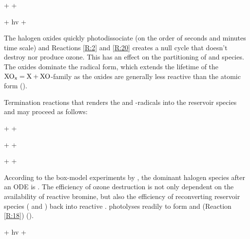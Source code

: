 \begin{reaction}
     +  \rightarrow {} + 
    \label{R:15}
\end{reaction}

\begin{reaction}
     + hv \rightarrow {} + 
    \label{R:20}
\end{reaction}

The halogen oxides quickly photodissociate (on the order of seconds and minutes time scale) and Reactions \ref{R:2} and \ref{R:20} creates a null cycle that doesn't destroy nor produce ozone. This has an effect on the partitioning of  and  species. The oxides dominate the radical form, which extends the lifetime of the $\mathrm{XO_x} = \mathrm{X} + \mathrm{XO}$-family as the oxides are generally less reactive than the atomic form (\cite{Simpson2015}). 


\medskip

Termination reactions that renders the  and -radicals into the reservoir species  and  may proceed as follows: 


\begin{reaction}
     +  \rightarrow {} + 
    \label{R:6} 
\end{reaction}

\begin{reaction}
     +  \rightarrow {} + 
    \label{R:17}
\end{reaction}


\begin{reaction}
     +  \rightarrow {} + 
    \label{R:16}
\end{reaction}


According to the box-model experiments by \cite{CAO}, the dominant halogen species after an ODE is . The efficiency of ozone destruction is not only dependent on the availability of reactive bromine, but also the efficiency of reconverting reservoir species ( and ) back into reactive .  photolyses readily to form  and  (Reaction \ref{R:18}) (\cite{Hausmann1994}).

\begin{reaction}
     + hv \rightarrow {} + 
    \label{R:18}
\end{reaction}



